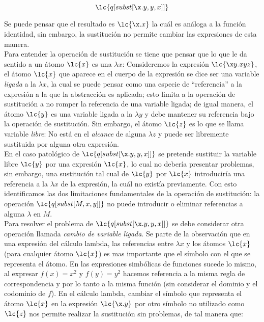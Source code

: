 \[\lc{q[subst[\x.y,y,x]]}\]

Se puede pensar que el resultado es \(\lc{\x.x}\) la cuál es análoga a la
función identidad, sin embargo, la sustitución no permite cambiar las
expresiones de esta manera. \\

Para entender la operación de sustitución se tiene que pensar que lo que le da
sentido a un átomo \(\lc{x}\) es una \(\lambda x\): Consideremos la expresión
\(\lc{\x y.x y z}\), el átomo \(\lc{x}\) que aparece en el cuerpo de la
expresión se dice ser una variable \emph{ligada} a la \(\lambda x\), la cual se
puede pensar como una especie de ``referencia'' a la expresión a la que la
abstracción es aplicada; esto limita a la operación de sustitución a no romper
la referencia de una variable ligada; de igual manera, el átomo \(\lc{y}\) es
una variable ligada a la \(\lambda y\) y debe mantener su referencia bajo la
operación de sustitución. Sin embargo, el átomo \(\lc{z}\) es lo que se llama
variable \emph{libre}: No está en el \emph{alcance} de alguna
\(\lambda z\) y puede ser libremente sustituida por alguna otra expresión. \\

En el caso patológico de \(\lc{q[subst[\x.y,y,x]]}\) se pretende sustituir la
variable libre \(\lc{y}\) por una expresión \(\lc{x}\), lo cual no debería
presentar problemas, sin embargo, una sustitución tal cual de \(\lc{y}\) por
\(\lc{x}\) introduciría una referencia a la \(\lambda x\) de la expresión, la
cuál no existía previamente. Con esto identificamos las dos limitaciones
fundamentales de la operación de sustitución: la operación
\(\lc{q[subst[M,x,y]]}\) no puede introducir o eliminar referencias a alguna
\(\lambda\) en \(M\). \\

Para resolver el problema de \(\lc{q[subst[\x.y,y,x]]}\) se debe considerar otra
operación llamada \emph{cambio de variable ligada}. Se parte de la observación
que en una expresión del cálculo lambda, las referencias entre \(\lambda x\) y
los átomos \(\lc{x}\) (para cualquier átomo \(\lc{x}\)) es mas importante que el
símbolo con el que se representa el átomo. En las expresiones simbólicas de
funciones sucede lo mismo, al expresar \(f(x)=x^{2}\) y \(f(y)=y^{2}\) hacemos
referencia a la misma regla de correspondencia y por lo tanto a la misma función
(sin considerar el dominio y el codominio de \(f\)). En el cálculo lambda,
cambiar el símbolo que representa el átomo \(\lc{x}\) en la expresión
\(\lc{\x.y}\) por otro símbolo no utilizado como \(\lc{z}\) nos permite realizar
la sustitución sin problemas, de tal manera que:

